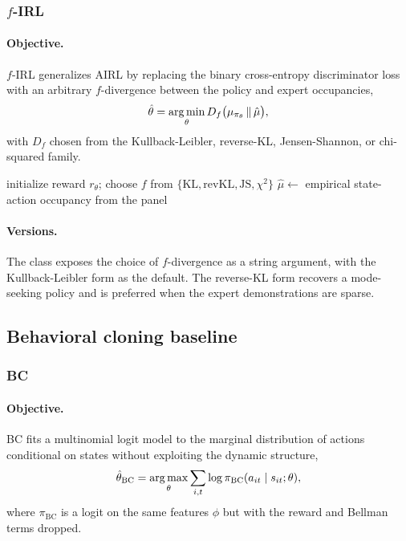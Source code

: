 \subsubsection{$f$-IRL}

\paragraph{Objective.} $f$-IRL \citep{ni2021firl} generalizes AIRL by replacing the binary cross-entropy discriminator loss with an arbitrary $f$-divergence between the policy and expert occupancies,
\begin{equation}
\hat\theta = \operatorname*{arg\,min}_\theta D_f \big( \mu_{\pi_\theta} \,\|\, \hat\mu \big),
\label{eq:firl}
\end{equation}
with $D_f$ chosen from the Kullback-Leibler, reverse-KL, Jensen-Shannon, or chi-squared family.

\begin{algorithm}[H]
\SetAlgoLined
initialize reward $r_\theta$; choose $f$ from $\{\mathrm{KL}, \mathrm{revKL}, \mathrm{JS}, \chi^2\}$\;
$\hat\mu \leftarrow$ empirical state-action occupancy from the panel\;
\caption{$f$-divergence IRL}
\end{algorithm}

\paragraph{Versions.} The  class exposes the choice of $f$-divergence as a string argument, with the Kullback-Leibler form as the default. The reverse-KL form recovers a mode-seeking policy and is preferred when the expert demonstrations are sparse.

\subsection{Behavioral cloning baseline}

\subsubsection{BC}

\paragraph{Objective.} BC fits a multinomial logit model to the marginal distribution of actions conditional on states without exploiting the dynamic structure,
\begin{equation}
\hat\theta_{\mathrm{BC}} = \operatorname*{arg\,max}_\theta \sum_{i, t} \log \pi_{\mathrm{BC}}(a_{it} \mid s_{it}; \theta),
\label{eq:bc}
\end{equation}
where $\pi_{\mathrm{BC}}$ is a logit on the same features $\phi$ but with the reward and Bellman terms dropped.


